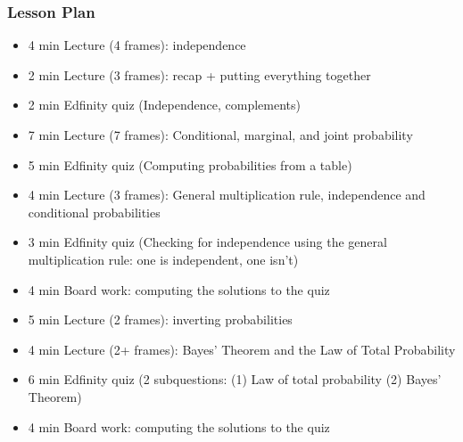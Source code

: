 \begin{frame}
    \frametitle{Lesson Plan}
    \begin{itemize}
        \item 4 min Lecture (4 frames): independence
        \item 2 min Lecture (3 frames): recap + putting everything together

        \item 2 min Edfinity quiz (Independence, complements)
        \item 7 min Lecture (7 frames): Conditional, marginal, and joint probability
        \item 5 min Edfinity quiz (Computing probabilities from a table)
        \item 4 min Lecture (3 frames): General multiplication rule, independence and conditional probabilities
        \item 3 min Edfinity quiz (Checking for independence using the general multiplication rule: one is independent, one isn't)
        \item 4 min Board work: computing the solutions to the quiz
        \item 5 min Lecture (2 frames): inverting probabilities
        \item 4 min Lecture (2+ frames): Bayes' Theorem and the Law of Total Probability
        \item 6 min Edfinity quiz (2 subquestions: (1) Law of total probability (2) Bayes' Theorem)
        \item 4 min Board work: computing the solutions to the quiz
    \end{itemize}
\end{frame}


